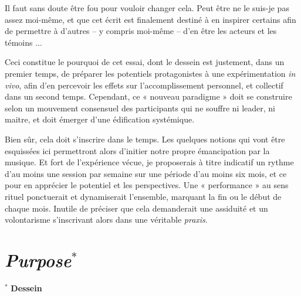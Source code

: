 \documentclass{article}
\begin{document}
Il faut sans doute être fou pour vouloir changer cela. Peut être ne le suis-je pas assez moi-même, et que cet écrit est finalement destiné à en inspirer certains afin de permettre à d'autres -- y compris moi-même -- d'en être les acteurs et les témoins ...

\bigskip
Ceci constitue le pourquoi de cet essai, dont le dessein est justement, dans un premier temps, de préparer les potentiels protagonistes à une expérimentation \textit{in vivo}, afin d'en percevoir les effets sur l'accomplissement personnel, et collectif dans un second temps. Cependant, ce « nouveau paradigme » doit se construire selon un mouvement consensuel des participants qui ne souffre ni leader, ni  maitre, et doit émerger d'une édification systémique. 

Bien sûr, cela doit s'inscrire dans le temps. Les quelques notions qui vont être esquissées ici permettront alors d'initier notre propre émancipation par la musique. 
Et fort de l'expérience vécue, je proposerais à titre indicatif un rythme d'au moins une session par semaine sur une période d'au moins six mois, et ce pour en apprécier le potentiel et les perspectives. 
Une « performance » au sens rituel ponctuerait et dynamiserait l'ensemble, marquant la fin ou le début de chaque mois. Inutile de préciser que cela demanderait une assiduité et un volontarisme s'inscrivant alors dans une véritable \textit{praxis}. 


\section*{\textsl{Purpose}$^\ast$}
$^\ast$ \textbf{Dessein}
\end{document}
